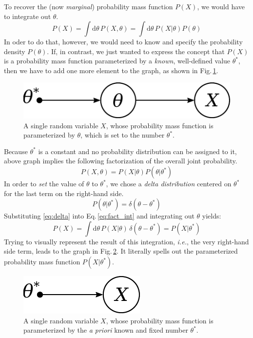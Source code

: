 \documentclass[]{report}
\begin{document}
To recover the (now \emph{marginal}) probability mass function $P(X)$, we would have to integrate out $\theta$.
\begin{equation} \label{eq:int}
P(X) = \int\mathrm{d}\theta\,P(X, \theta) = \int\mathrm{d}\theta\,P(X|\theta)P(\theta)
\end{equation}
In oder to do that, however, we would need to know and specify the probability density $P(\theta)$. If, in contrast, we just wanted to express the concept that $P(X)$ is a probability mass function parameterized by a \emph{known}, well-defined value $\theta^*$, then we have to add one more element to the graph, as shown in Fig.\,\ref{fig:1var1param1const}.
\begin{figure}[h]
	\centering
	\includegraphics[scale=0.5]{1var_1param_1const}
	\caption{A single random variable $X$, whose probability mass function is parameterized by $\theta$, which is set to the number $\theta^*$.}
	\label{fig:1var1param1const}
\end{figure}
Because $\theta^*$ is a constant and no probability distribution can be assigned to it, above graph implies the following factorization of the overall joint probability.
\begin{equation} \label{eq:fact_int}
P(X, \theta) = P(X|\theta)P(\theta|\theta^*)
\end{equation}
In order to \emph{set} the value of $\theta$ to $\theta^*$, we chose a \emph{delta distribution} centered on $\theta^*$ for the last term on the right-hand side.
\begin{equation} \label{eq:delta}
P(\theta|\theta^*) = \delta(\theta-\theta^*)
\end{equation}
Substituting \ref{eq:delta} into Eq.\,\ref{eq:fact_int} and integrating out $\theta$ yields:
\begin{equation} \label{eq:param}
P(X) = \int\mathrm{d}\theta\,P(X|\theta)\,\delta(\theta-\theta^*) = P(X|\theta^*)
\end{equation}
Trying to visually represent the result of this integration, \textit{i.e.}, the very right-hand side term, leads to the graph in Fig.\,\ref{fig:1var1const}. It literally spells out the parameterized probability mass function $P(X|\theta^*)$.
\begin{figure}[h]
	\centering
	\includegraphics[scale=0.5]{1var_1const}
	\caption{A single random variable $X$, whose probability mass function is parameterized by the \emph{a priori} known and fixed number $\theta^*$.}
	\label{fig:1var1const}
\end{figure}
\end{document}
